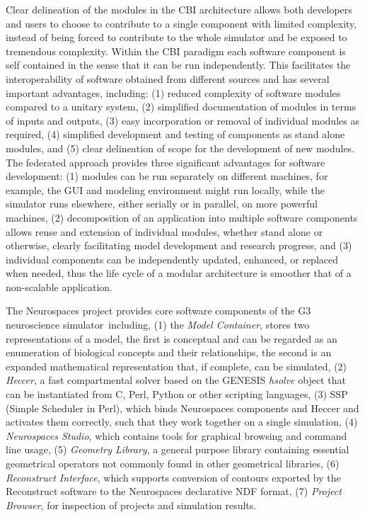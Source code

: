 \documentclass[12pt]{article}
\begin{document}
Clear delineation of the modules in the CBI architecture allows both
developers and users to choose to contribute to a single component
with limited complexity, instead of being forced to contribute to the
whole simulator and be exposed to tremendous complexity. Within the
CBI paradigm each software component is self contained in the sense
that it can be run independently. This facilitates the
interoperability of software obtained from different sources and has
several important advantages, including: (1) reduced complexity of
software modules compared to a unitary system, (2) simplified
documentation of modules in terms of inputs and outputs, (3) easy
incorporation or removal of individual modules as required, (4)
simplified development and testing of components as stand alone
modules, and (5) clear delineation of scope for the development of new
modules. The federated approach provides three significant advantages
for software development: (1) modules can be run separately on
different machines, for example, the GUI and modeling environment
might run locally, while the simulator runs elsewhere, either serially
or in parallel, on more powerful machines, (2) decomposition of an
application into multiple software components allows reuse and
extension of individual modules, whether stand alone or otherwise,
clearly facilitating model development and research progress, and (3)
individual components can be independently updated, enhanced, or
replaced when needed, thus the life cycle of a modular architecture is
smoother that of a non-scalable application.

The Neurospaces project provides core software components of the G3
neuroscience simulator\,\cite{cornelis03:_neuros} including, (1) the
{\it Model Container}, stores two representations of a model, the
first is conceptual and can be regarded as an enumeration of
biological concepts and their relationships, the second is an expanded
mathematical representation that, if complete, can be simulated, (2)
{\it Heccer}, a fast compartmental solver based on the GENESIS {\it
  hsolve} object that can be instantiated from C, Perl, Python or
other scripting languages, (3) SSP (Simple Scheduler in Perl), which
binds Neurospaces components and Heccer and activates them correctly,
such that they work together on a single simulation, (4) {\it
  Neurospaces Studio}, which contains tools for graphical browsing and
command line usage, (5) {\it Geometry Library}, a general purpose
library containing essential geometrical operators not commonly found
in other geometrical libraries, (6) {\it Reconstruct Interface}, which
supports conversion of contours exported by the Reconstruct software
to the Neurospaces declarative NDF format, (7) {\it Project Browser},
for inspection of projects and simulation results.
\end{document}
